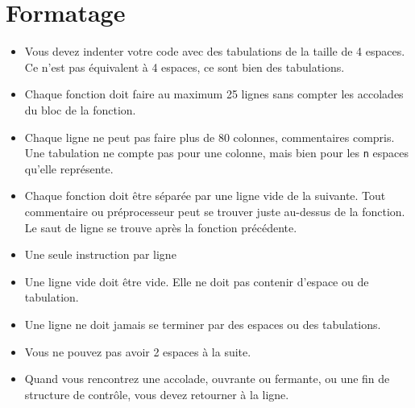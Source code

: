 \documentclass{42-fr}
\begin{document}
    \section{Formatage}

            \begin{itemize}

                \item Vous devez indenter votre code avec des tabulations de la taille de 4 espaces. 
                    Ce n’est pas équivalent à 4 espaces, ce sont bien des tabulations.

                \item Chaque fonction doit faire au maximum 25 lignes 
                    sans compter les accolades du bloc de la fonction.

                \item Chaque ligne ne peut pas faire plus de 80 colonnes, commentaires compris. 
                    Une tabulation ne compte pas pour une colonne, mais bien pour les \texttt{n} espaces qu’elle représente.

                \item Chaque fonction doit être séparée par une ligne vide de la suivante. 
                    Tout commentaire ou préprocesseur peut se trouver juste au-dessus
                    de la fonction. Le saut de ligne se trouve après la fonction précédente.

                \item Une seule instruction par ligne

                \item Une ligne vide doit être vide. Elle ne doit pas contenir d’espace ou de tabulation.

                \item Une ligne ne doit jamais se terminer par des espaces ou des tabulations.

                \item Vous ne pouvez pas avoir 2 espaces à la suite.

                \item Quand vous rencontrez une accolade, ouvrante ou fermante, 
                    ou une fin de structure de contrôle, vous devez retourner à la ligne.


\end{itemize}
\end{document}
